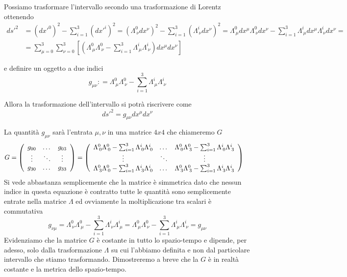 \documentclass[12pt,a4paper,titlepage, twoside, openright]{book}
\numberwithin{equation}{chapter}
\begin{document}
Possiamo trasformare l'intervallo secondo una trasformazione di Lorentz ottenendo
\begin{align*} 
ds'^2 &= (dx'^0)^2-\sum_ {i=1}^3(dx'^i)^2 = (\Lambda^0_{\> \nu} dx^\nu)^2 - \sum_{i=1}^3 (\Lambda^i_{\> \nu} dx^\nu)^2 = 
\Lambda^0_{\> \mu} dx^\mu \Lambda^0_{\> \nu} dx^\nu - \sum_{i=1}^3 \Lambda^i_{\> \mu} dx^\mu \Lambda^i_{\> \nu} dx^\nu = \\
&= \sum_{\mu=0}^3 \sum_{\nu=0}^3 \left[ \left( \Lambda^0_{\> \mu} \Lambda^0_{\> \nu} - \sum_{i=1}^3 \Lambda^i_{\> \mu} \Lambda^i_{\> \nu} \right) dx^\mu dx^\nu \right]
\end{align*}

e definire un oggetto a due indici
\begin{equation}\label{metrica}
g_{\mu \nu} \mathrel{\mathop:}= \Lambda^0_{\> \mu} \Lambda^0_{\> \nu} - \sum_{i=1}^3 \Lambda^i_{\> \mu} \Lambda^i_{\> \nu}
\end{equation}

Allora la trasformazione dell'intervallo si potrà riscrivere come
\begin{equation} \label{Trasformazione intervallo invariante}
ds'^2=g_{\mu \nu} dx^\mu dx^\nu
\end{equation}

La quantità $g_{\mu \nu}$ sarà l'entrata $\mu , \nu$ in una matrice $4x4$ che chiameremo $G$
\begin{align*}
G&=\left(\begin{array}{c c c}
g_{00} & \dots & g_{03} \\
\vdots & \ddots & \vdots \\
g_{30} & \dots & g_{33} \\
\end{array}\right) = \left(
\begin{array}{ccc}
\Lambda^0_{\> 0} \Lambda^0_{\> 0} - \sum_{i=1}^3 \Lambda^i_{\> 0} \Lambda^i_{\> 0} & \dots &
\Lambda^0_{\> 0} \Lambda^0_{\> 3} - \sum_{i=1}^3 \Lambda^i_{\> 0} \Lambda^i_{\> 3} \\
\vdots & \ddots & \vdots \\
\Lambda^0_{\> 3} \Lambda^0_{\> 0} - \sum_{i=1}^3 \Lambda^i_{\> 3} \Lambda^i_{\> 0} &
\dots &
\Lambda^0_{\> 3} \Lambda^0_{\> 3} - \sum_{i=1}^3 \Lambda^i_{\> 3} \Lambda^i_{\> 3} \\
\end{array}\right) 
\end{align*}
Si vede abbastanza semplicemente che la matrice è simmetrica dato che nessun indice in questa equazione è contratto tutte le quantità sono semplicemente entrate nella matrice $\Lambda$ ed ovviamente la moltiplicazione tra scalari è commutativa
\[
g_{\nu\mu}=\Lambda^0_{\> \nu} \Lambda^0_{\> \mu} - \sum_{i=1}^3 \Lambda^i_{\> \nu} \Lambda^i_{\> \mu} = \Lambda^0_{\> \mu} \Lambda^0_{\> \nu} - \sum_{i=1}^3 \Lambda^i_{\> \mu} \Lambda^i_{\> \nu} = g_{\mu \nu}
\]
Evidenziamo che la matrice $G$ è costante in tutto lo spazio-tempo e dipende, per adesso, solo dalla trasformazione $\Lambda$ su cui l'abbiamo definita e non dal particolare intervallo che stiamo trasformando. Dimostreremo a breve che la $G$ è in realtà costante e la metrica dello spazio-tempo.
\end{document}
